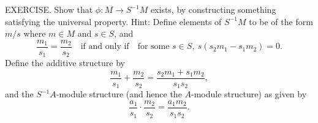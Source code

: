 EXERCISE. Show that $\phi : M \to S^{-1}M$ exists, by constructing something satisfying the universal property. Hint: Define elements of $S^{-1}M$ to be of the form $m/s$ where $m \in M$ and $s \in S$, and
$$
\frac{m_1}{s_1} = \frac{m_2}{s_2}
\quad\text{if and only if}\quad
\text{for some }s\in S,\ s(s_2m_1-s_1m_2)=0.
$$
Define the additive structure by
$$
\frac{m_1}{s_1}+\frac{m_2}{s_2}=\frac{s_2m_1+s_1m_2}{s_1s_2},
$$
and the $S^{-1}A$-module structure (and hence the $A$-module structure) as given by
$$
\frac{a_1}{s_1}\cdot\frac{m_2}{s_2}=\frac{a_1m_2}{s_1s_2}.
$$
